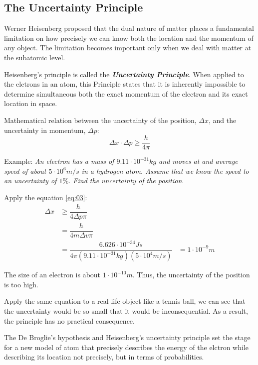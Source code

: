 \documentclass[12pt, a4paper]{report}
\newcommand{\impt}[1]{\textbf{\textit{#1}}}
\newcommand{\hii}{\subsection}
\newcommand{\mul}{\cdot}
\begin{document}
    \hii{The Uncertainty Principle}
        \par Werner Heisenberg proposed that the dual nature of matter places a fundamental
        limitation on how precisely we can know both the location and the momentum of any object.
        The limitation becomes important only when we deal with matter at the subatomic level.
        \par Heisenberg's principle is called the \impt{Uncertainty Principle}. When applied
        to the elctrons in an atom, this Principle states that it is inherently impossible to
        determine simultaneous both the exact momentum of the electron and its exact location
        in space.
        \par Mathematical relation between the uncertainty of the position, $\Delta x$, and the
        uncertainty in momentum, $\Delta p$:
        \begin{equation} \label{eq:03}
            \Delta x \mul \Delta p \geq \dfrac{h}{4\pi}
        \end{equation}
        \par Example: \textit{An electron has a mass of $9.11 \mul 10^{-31} kg$ and moves at and
        average speed of about $5 \mul 10^{6} m/s$ in a hydrogen atom. Assume that we know the
        speed to an uncertainty of $1\%$. Find the uncertainty of the position}.
        \par Apply the equation \eqref{eq:03}:
        \begin{equation}
            \begin{aligned}
                \Delta x & \geq \dfrac{h}{4 \Delta p \pi} \\
                & = \dfrac{h}{4m \Delta v \pi} \\
                & = \dfrac{6.626 \mul 10^{-34} Js}{4 \pi(9.11 \mul 10^{-31} kg)(5 \mul 10^{4} m/s)}
                & = 1 \mul 10^{-9} m
            \end{aligned}
        \end{equation}
        \par The size of an electron is about $1 \mul 10^{-10} m$. Thus, the uncertainty of the
        position is too high.
        \par Apply the same equation to a real-life object like a tennis ball, we can see that
        the uncertainty would be so small that it would be inconsequential. As a result, the
        principle has no practical consequence.
        \par The De Broglie's hypothesis and Heisenberg's uncertainty principle set the stage for
        a new model of atom that precisely describes the energy of the elctron while describing
        its location not precisely, but in terms of probabilities.
\end{document}
